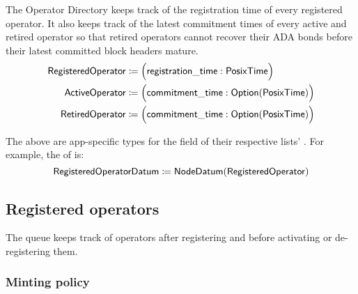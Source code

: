 \documentclass[../midgard.tex]{subfiles}
\begin{document}
The Operator Directory keeps track of the registration time of every registered operator. It also keeps track of the latest commitment times of every active and retired operator so that retired operators cannot recover their ADA bonds before their latest committed block headers mature.
\begin{align*}
    \mathsf{RegisteredOperator} &\coloneq \Bigl( \mathsf{registration\_time}: \mathsf{PosixTime} \Bigr) \\
    \mathsf{ActiveOperator}     &\coloneq \Bigl( \mathsf{commitment\_time}:
        \mathsf{Option}(\mathsf{PosixTime}) \Bigr) \\
    \mathsf{RetiredOperator}    &\coloneq \Bigl( \mathsf{commitment\_time}:
        \mathsf{Option}(\mathsf{PosixTime}) \Bigr)
\end{align*}

The above are app-specific types for the  field of their respective lists' . For example, the  of  is:
\begin{equation*}
    \mathsf{RegisteredOperatorDatum} \coloneq \mathsf{NodeDatum} (\mathsf{RegisteredOperator})
\end{equation*}

\subsection{Registered operators}
\label{h:registered-operators}

The  queue keeps track of operators after registering and before activating or de-registering them.

\subsubsection{Minting policy}
\label{h:registered-operators-minting-policy}
\end{document}
